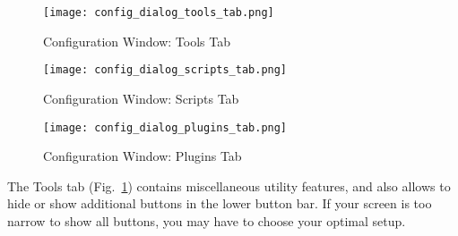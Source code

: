 \begin{figure}[p]
\centering\texttt{[image: config\_dialog\_tools\_tab.png]}
\caption{Configuration Window: Tools Tab}
\label{fig:gui:configuration:tools}
\end{figure}

\begin{figure}[p]
\centering\texttt{[image: config\_dialog\_scripts\_tab.png]}
\caption{Configuration Window: Scripts Tab}
\label{fig:gui:configuration:scripts}
\end{figure}

\begin{figure}[p]
\centering\texttt{[image: config\_dialog\_plugins\_tab.png]}
\caption{Configuration Window: Plugins Tab}
\label{fig:gui:plugins}
\end{figure}


The Tools tab (Fig.~\ref{fig:gui:configuration:tools}) contains miscellaneous utility
features, and also allows to hide or show additional buttons in the lower button bar. 
If your screen is too narrow to show all buttons, you may have to choose your optimal setup.


